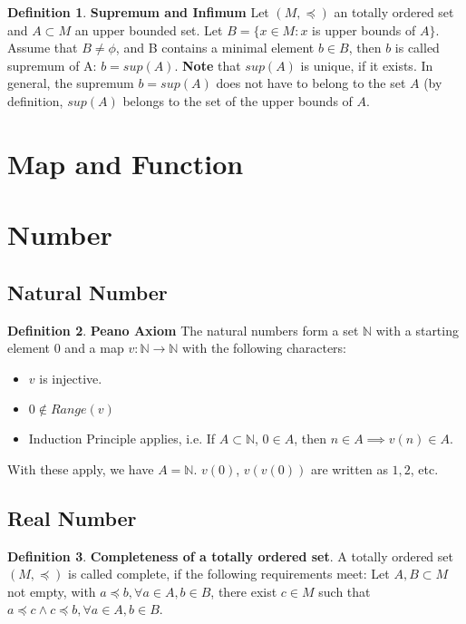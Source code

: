 \documentclass{article}
\theoremstyle{definition}
\newtheorem{defi}{Definition}[subsection]
\begin{document}
\begin{defi}
\textbf{Supremum and Infimum} Let $(M, \preceq)$ an totally ordered set and $A\subset M$ an upper bounded set. Let $B=\{x\in M: x $ is upper bounds of $A\}$. Assume that $B \neq \phi$, and B contains a minimal element $b \in B$, then $b$ is called supremum of A: $b = sup(A)$. \textbf{Note} that $sup(A)$ is unique, if it exists. In general, the supremum $b = sup(A)$ does not have to belong to the set $A$ (by definition, $sup(A)$ belongs to the set of the upper bounds of $A$.
\end{defi}

\section{Map and Function}

\section{Number}

\subsection{Natural Number}

\begin{defi}
\textbf{Peano Axiom} The natural numbers form a set $\mathbb{N}$ with a starting element $0$ and a map $v: \mathbb{N}\to \mathbb{N}$ with the following characters:

\begin{itemize}
    \item $v$ is injective.
    \item $0 \not\in Range(v)$
    \item Induction Principle applies, i.e. If $A \subset \mathbb{N}$, $0\in A$, then $n\in A \implies v(n) \in A$.
\end{itemize}

With these apply, we have $A=\mathbb{N}$. $v(0)$, $v(v(0))$ are written as $1,2$, etc.

\end{defi}

\subsection{Real Number}

\begin{defi}
\textbf{Completeness of a totally ordered set}. A totally ordered set $(M, \preceq)$ is called complete, if the following requirements meet: Let $A, B \subset M$ not empty, with $a \preceq b, \forall a\in A, b\in B$, there exist $c\in M$ such that $a \preceq c \land c \preceq b, \forall a\in A, b\in B$.
\end{defi}
\end{document}
